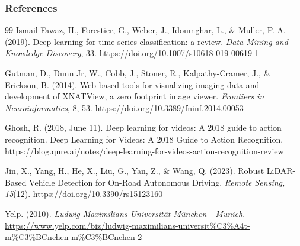\documentclass[11pt,compress,t,notes=noshow, xcolor=table]{beamer}
\begin{document}
\begin{vbframe}
\frametitle{References}
\footnotesize{
\begin{thebibliography}{99}
Ismail Fawaz, H., Forestier, G., Weber, J., Idoumghar, L., \& Muller, P.-A. (2019). Deep learning for time series classification: a review. \textit{Data Mining and Knowledge Discovery}, 33. \url{https://doi.org/10.1007/s10618-019-00619-1}

 Gutman, D., Dunn Jr, W., Cobb, J., Stoner, R., Kalpathy-Cramer, J., \& Erickson, B. (2014). Web based tools for visualizing imaging data and development of XNATView, a zero footprint image viewer. \textit{Frontiers in Neuroinformatics}, 8, 53. \url{https://doi.org/10.3389/fninf.2014.00053}

Ghosh, R. (2018, June 11). Deep learning for videos: A 2018 guide to action recognition. Deep Learning for Videos: A 2018 Guide to Action Recognition. https://blog.qure.ai/notes/deep-learning-for-videos-action-recognition-review 


 Jin, X., Yang, H., He, X., Liu, G., Yan, Z., \& Wang, Q. (2023). Robust LiDAR-Based Vehicle Detection for On-Road Autonomous Driving. \textit{Remote Sensing, 15}(12). \url{https://doi.org/10.3390/rs15123160}

Yelp. (2010). \textit{Ludwig-Maximilians-Universität München - Munich}. \url{https://www.yelp.com/biz/ludwig-maximilians-universit%C3%A4t-m%C3%BCnchen-m%C3%BCnchen-2} 


\end{thebibliography}}
\end{vbframe}
\end{document}
